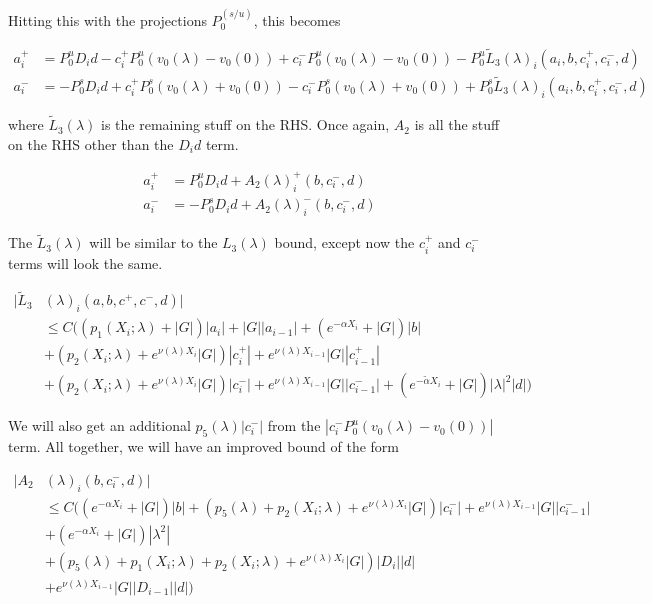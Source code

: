 \documentclass[12pt]{article}
\begin{document}
\begin{enumerate}
Hitting this with the projections $P^{(s/u)}_0$, this becomes

\begin{align*}
a_i^+ &= P^u_0 D_i d - c_i^+ P^u_0 (v_0(\lambda) - v_0(0)) + c_i^- P^u_0 (v_0(\lambda) - v_0(0)) - P^u_0 \tilde{L}_3(\lambda)_i(a_i, b, c_i^+, c_i^-, d) \\
a_i^- &= -P^s_0 D_i d + c_i^+ P^s_0 (v_0(\lambda) + v_0(0)) - c_i^- P^s_0 (v_0(\lambda) + v_0(0))+ P^s_0 \tilde{L}_3(\lambda)_i(a_i, b, c_i^+, c_i^-, d)
\end{align*}

where $\tilde{L}_3(\lambda)$ is the remaining stuff on the RHS. Once again, $A_2$ is all the stuff on the RHS other than the $D_i d$ term. 

\begin{align*}
a_i^+ &= P^u_0 D_i d + A_2(\lambda)_i^+(b, c_i^-, d) \\
a_i^- &= -P^s_0 D_i d + A_2(\lambda)_i^-(b, c_i^-, d)
\end{align*}

The $\tilde{L}_3(\lambda)$ will be similar to the $L_3(\lambda)$ bound, except now the $c_i^+$ and $c_i^-$ terms will look the same.

\begin{align*}
|\tilde{L}_3&(\lambda)_i(a, b, c^+, c^-, d)| \\
&\leq C \Big( (p_1(X_i; \lambda) + |G|)|a_i| + |G||a_{i-1}| + (e^{-\alpha X_i} + |G|) |b| \\
&+ ( p_2(X_i; \lambda) + e^{\nu(\lambda)X_i} |G|) |c_i^+| + e^{\nu(\lambda)X_{i-1}} |G| |c_{i-1}^+|   \\
&+ (p_2(X_i; \lambda) + e^{\nu(\lambda)X_i} |G|)|c_i^-| + e^{\nu(\lambda)X_{i-1}} |G||c_{i-1}^-| + (e^{-\tilde{\alpha} X_i} + |G|) |\lambda|^2 |d| \Big)
\end{align*} 

We will also get an additional $p_5(\lambda) |c_i^-|$ from the $|c_i^- P^u_0 (v_0(\lambda) - v_0(0))|$ term. All together, we will have an improved bound of the form

\begin{align*}
|A_2&(\lambda)_i(b, c_i^-, d)| \\
&\leq C \Big( ( e^{-\alpha X_i} + |G| ) |b| + (p_5(\lambda) + p_2(X_i; \lambda) + e^{\nu(\lambda)X_i} |G|)|c_i^-| + e^{\nu(\lambda)X_{i-1}} |G| |c_{i-1}^-| \\
&+ (e^{-\alpha X_i} + |G| ) |\lambda^2| \\
&+ (p_5(\lambda) + p_1(X_i; \lambda) + p_2(X_i; \lambda) + e^{\nu(\lambda)X_i} |G|)|D_i| |d| \\
&+ e^{\nu(\lambda)X_{i-1}} |G| |D_{i-1}||d| \Big)
\end{align*}


\end{enumerate}
\end{document}
